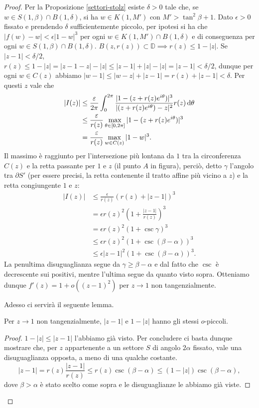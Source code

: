 \begin{proof}
  Per la Proposizione \ref{settori-stolz} esiste $\delta>0$ tale che, se $w \in S(1,\beta) \cap B(1,\delta)$, si ha $w \in K(1,M')$ con $M'>\tan^2\beta+1$.
  Dato $\epsilon>0$ fissato e prendendo $\delta$ sufficientemente piccolo, per ipotesi si ha che $|f(w)-w|<\epsilon|1-w|^3$ per ogni $w \in K(1,M') \cap B(1,\delta)$ e di conseguenza per ogni $w \in S(1,\beta) \cap B(1,\delta)$.
  $B(z,r(z)) \subset \mathbb{D} \implies r(z) \le 1-|z|$. Se $|z-1|<\delta/2$, $r(z) \le 1-|z|=|z-1-z|-|z| \le |z-1|+|z|-|z|=|z-1|<\delta/2$, dunque per ogni $w \in C(z)$ abbiamo $|w-1| \le |w-z|+|z-1|=r(z)+|z-1|<\delta$. Per questi $z$ vale che
  \begin{align*}
    |I(z)| & \le \frac{\varepsilon}{2\pi} \int_0^{2\pi} \frac{|1-(z+r(z)e^{i\theta})|^3}{|(z+r(z)e^{i\theta})-z|^2}r(z)\mathop{}\!\mathrm{d}\theta \\
    & \le \frac{\varepsilon}{r(z)}\max_{\theta \in [0,2\pi]} |1-(z+r(z)e^{i\theta})|^3 \\
    & =\frac{\varepsilon}{r(z)}\max_{w \in C(z)}|1-w|^3.
  \end{align*}
  Il massimo è raggiunto per l'intersezione più lontana da $1$ tra la circonferenza $C(z)$ e la retta passante per $1$ e $z$ (il punto $A$ in figura), perciò, detto $\gamma$ l'angolo tra $\partial S'$ (per essere precisi, la retta contenente il tratto affine più vicino a $z$) e la retta congiungente $1$ e $z$:
  \begin{align*}
    |I(z)| & \le \frac{\epsilon}{r(z)}(r(z)+|z-1|)^3 \\
    & =\epsilon r(z)^2\left(1+\frac{|z-1|}{r(z)}\right)^3 \\
    & =\epsilon r(z)^2(1+\csc\gamma)^3 \\
    & \le \epsilon r(z)^2(1+\csc(\beta-\alpha))^3 \\
    & \le \epsilon |z-1|^2(1+\csc(\beta-\alpha))^3.
  \end{align*}
  La penultima disuguaglianza segue da $\gamma \ge \beta-\alpha$ e dal fatto che $\csc$ è decrescente sui positivi, mentre l'ultima segue da quanto visto sopra. Otteniamo dunque $f'(z)=1+o((z-1)^2)$ per $z \longrightarrow 1$ non tangenzialmente.

  Adesso ci servirà il seguente lemma.

  \begin{lm} \label{opiccoli}
    Per $z \longrightarrow 1$ non tangenzialmente, $|z-1|$ e $1-|z|$ hanno gli stessi $o$-piccoli.
  \end{lm}

  \begin{proof}
    $1-|z| \le |z-1|$ l'abbiamo già visto. Per concludere ci basta dunque mostrare che, per $z$ appartenente a un settore $S$ di angolo $2\alpha$ fissato, vale una disuguaglianza opposta, a meno di una qualche costante.
    $$|z-1|=r(z)\frac{|z-1|}{r(z)} \le r(z)\csc(\beta-\alpha) \le (1-|z|)\csc(\beta-\alpha),$$
    dove $\beta>\alpha$ è stato scelto come sopra e le disuguaglianze le abbiamo già viste.
  \end{proof}


\end{proof}
